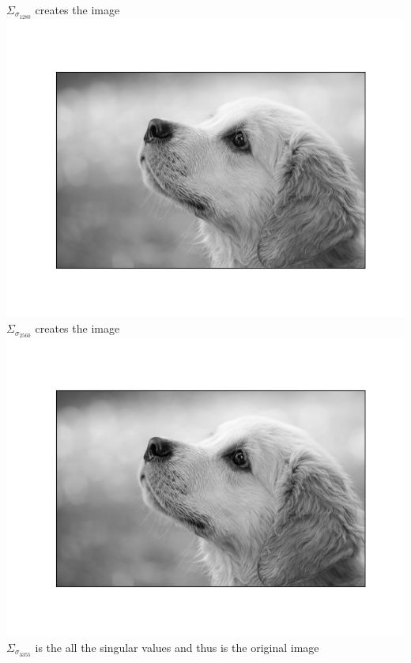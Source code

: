 \documentclass[12pt]{article}
\begin{document}
\newpage
		$\Sigma_{\sigma_{1280}}$ creates the image \\
		\includegraphics[scale=0.8]{part1/prob_a/Figure_7} \\
		$\Sigma_{\sigma_{2560}}$ creates the image \\
		\includegraphics[scale=0.8]{part1/prob_a/Figure_8} \\
\newpage		
		$\Sigma_{\sigma_{3355}}$ is the all the singular values and thus is the original image \\
\end{document}
